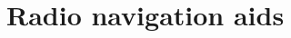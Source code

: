 \documentclass[Orbiter User Manual.tex]{subfiles}
\begin{document}
\section{Radio navigation aids}

\end{document}
